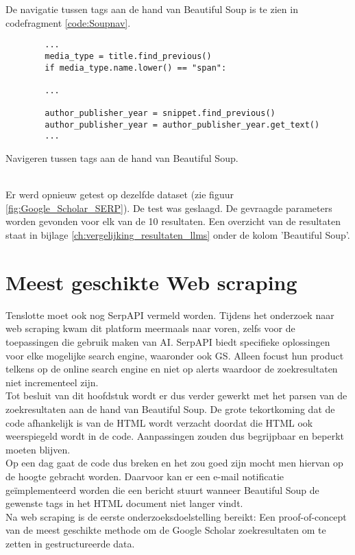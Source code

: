 De navigatie tussen tags aan de hand van Beautiful Soup is te zien in codefragment \ref{code:Soupnav}.
\begin{listing}[h!]
    \begin{verbatim}
        ...
        media_type = title.find_previous()
        if media_type.name.lower() == "span":
        
        ...
        
        author_publisher_year = snippet.find_previous()
        author_publisher_year = author_publisher_year.get_text()
        ...
    \end{verbatim}
    \caption[Beautiful Soup navigatie]{Navigeren tussen tags aan de hand van Beautiful Soup.}
    \label{code:Soupnav}
\end{listing}
\\
Er werd opnieuw getest op dezelfde dataset  (zie figuur \ref{fig:Google_Scholar_SERP}). De test was geslaagd. De gevraagde parameters worden gevonden voor elk van de 10 resultaten. Een overzicht van de resultaten staat in bijlage \ref{ch:vergelijking_resultaten_llms} onder de kolom 'Beautiful Soup'. 
\section{Meest geschikte Web scraping}
Tenslotte moet ook nog SerpAPI \autocite{Serpapi2025} vermeld worden. Tijdens het onderzoek naar web scraping kwam dit platform meermaals naar voren, zelfs voor de toepassingen die gebruik maken van AI. SerpAPI biedt specifieke oplossingen voor elke mogelijke search engine, waaronder ook GS. Alleen focust hun product telkens op de online search engine en niet op alerts waardoor de zoekresultaten niet incrementeel zijn.\\
Tot besluit van dit hoofdstuk wordt er dus verder gewerkt met het parsen van de zoekresultaten aan de hand van Beautiful Soup. De grote tekortkoming dat de code afhankelijk is van de HTML wordt verzacht doordat die HTML ook weerspiegeld wordt in de code. Aanpassingen zouden dus begrijpbaar en beperkt moeten blijven.\\
Op een dag gaat de code dus breken en het zou goed zijn mocht men hiervan op de hoogte gebracht worden. Daarvoor kan er een e-mail notificatie geïmplementeerd worden die een bericht stuurt wanneer Beautiful Soup de gewenste tags in het HTML document niet langer vindt.\\
Na web scraping is de eerste onderzoeksdoelstelling bereikt: Een proof-of-concept van de meest geschikte methode om de Google Scholar zoekresultaten om te zetten in gestructureerde data.
